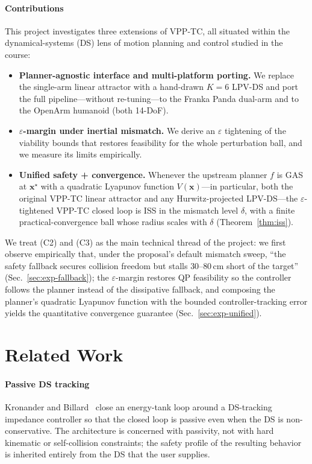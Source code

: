 \documentclass[10pt,conference]{IEEEtran}
\newcommand{\bx}{\bm{x}}
\theoremstyle{remark}
\theoremstyle{plain}
\begin{document}
\paragraph*{Contributions} This project investigates three
extensions of VPP-TC, all situated within the dynamical-systems
(DS) lens of motion planning and control studied in the course:
\begin{itemize}
    \item[(C1)] \textbf{Planner-agnostic interface and
        multi-platform porting.} We replace the single-arm linear
        attractor with a hand-drawn $K{=}6$ LPV-DS and port the
        full pipeline---without re-tuning---to the Franka Panda
        dual-arm and to the OpenArm humanoid (both 14-DoF).
    \item[(C2)] \textbf{$\varepsilon$-margin under inertial
        mismatch.} We derive an $\varepsilon$ tightening of the
        viability bounds that restores feasibility for the whole
        perturbation ball, and we measure its limits empirically.
    \item[(C3)] \textbf{Unified safety + convergence.} Whenever the
        upstream planner $f$ is GAS at $\bx^\star$ with a quadratic
        Lyapunov function $V(\bx)$---in particular, both the
        original VPP-TC linear attractor and any Hurwitz-projected
        LPV-DS---the $\varepsilon$-tightened VPP-TC closed loop is
        ISS in the mismatch level $\delta$, with a finite
        practical-convergence ball whose radius scales with
        $\delta$ (Theorem~\ref{thm:iss}).
\end{itemize}

We treat (C2) and (C3) as the main technical thread of the
project: we first observe empirically that, under the proposal's
default mismatch sweep, ``the safety fallback secures collision
freedom but stalls $30$--$80$\,cm short of the target''
(Sec.~\ref{sec:exp-fallback}); the $\varepsilon$-margin restores
QP feasibility so the controller follows the planner instead of
the dissipative fallback, and composing the planner's quadratic
Lyapunov function with the bounded controller-tracking error
yields the quantitative convergence guarantee
(Sec.~\ref{sec:exp-unified}).

\section{Related Work}

\paragraph*{Passive DS tracking}  Kronander and
Billard~\cite{kronander2016passive} close an energy-tank loop
around a DS-tracking impedance controller so that the closed loop
is passive even when the DS is non-conservative. The architecture
is concerned with passivity, not with hard kinematic or
self-collision constraints; the safety profile of the resulting
behavior is inherited entirely from the DS that the user supplies.
\end{document}
